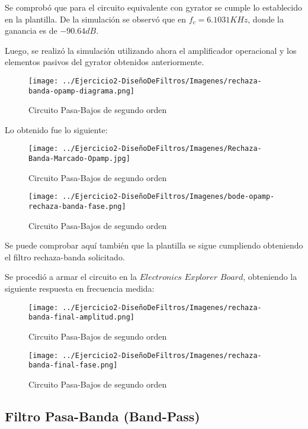 Se comprobó que para el circuito equivalente con gyrator se cumple lo establecido en la plantilla.
De la simulación se observó que en $f_c=6.1031 KHz$, donde la ganancia es de $-90.64 dB$.

Luego, se realizó la simulación utilizando ahora el amplificador operacional y los elementos pasivos del gyrator obtenidos anteriormente.

\begin{figure}[H]
    \centering
    \texttt{[image: ../Ejercicio2-DiseñoDeFiltros/Imagenes/rechaza-banda-opamp-diagrama.png]}
    \caption{Circuito Pasa-Bajos de segundo orden}
\end{figure}

Lo obtenido fue lo siguiente:

\begin{figure}[H]
    \centering
    \texttt{[image: ../Ejercicio2-DiseñoDeFiltros/Imagenes/Rechaza-Banda-Marcado-Opamp.jpg]}
    \caption{Circuito Pasa-Bajos de segundo orden}
\end{figure}

\begin{figure}[H]
    \centering
    \texttt{[image: ../Ejercicio2-DiseñoDeFiltros/Imagenes/bode-opamp-rechaza-banda-fase.png]}
    \caption{Circuito Pasa-Bajos de segundo orden}
\end{figure}

Se puede comprobar aquí también que la plantilla se sigue cumpliendo obteniendo el filtro rechaza-banda solicitado.

Se procedió a armar el circuito en la $Electronics$ $Explorer$ $Board$, obteniendo la siguiente respuesta en frecuencia medida:

\begin{figure}[H]
    \centering
    \texttt{[image: ../Ejercicio2-DiseñoDeFiltros/Imagenes/rechaza-banda-final-amplitud.png]}
    \caption{Circuito Pasa-Bajos de segundo orden}
\end{figure}

\begin{figure}[H]
    \centering
    \texttt{[image: ../Ejercicio2-DiseñoDeFiltros/Imagenes/rechaza-banda-final-fase.png]}
    \caption{Circuito Pasa-Bajos de segundo orden}
\end{figure}


\subsection{Filtro Pasa-Banda (Band-Pass)}

